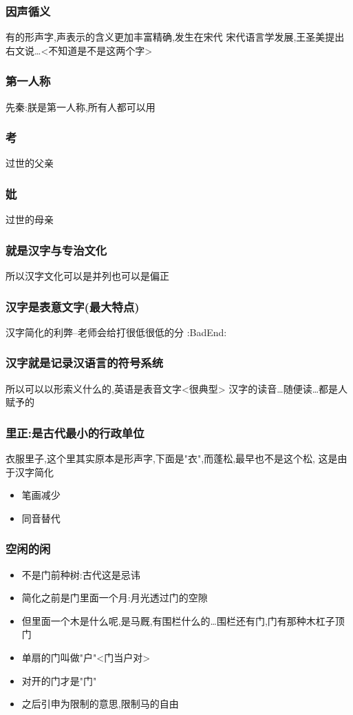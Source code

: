\documentclass[11pt]{article}
\begin{document}
\subsubsection{因声循义}
\label{sec:orga6aa051}
有的形声字,声表示的含义更加丰富精确,发生在宋代
宋代语言学发展,王圣美提出右文说\ldots{}<不知道是不是这两个字>
\subsubsection{第一人称}
\label{sec:org93fc844}
先秦:朕是第一人称,所有人都可以用
\subsubsection{考}
\label{sec:orge879933}
过世的父亲
\subsubsection{妣}
\label{sec:orge92db9c}
过世的母亲
\subsubsection{就是汉字与专治文化}
\label{sec:orge1c0486}
所以汉字文化可以是并列也可以是偏正
\subsubsection{汉字是表意文字(最大特点)}
\label{sec:org4297bd4}
汉字简化的利弊--老师会给打很低很低的分 :BadEnd:
\subsubsection{汉字就是记录汉语言的符号系统}
\label{sec:org5a0b286}
所以可以以形索义什么的,英语是表音文字<很典型>
汉字的读音\ldots{}随便读\ldots{}都是人赋予的


\subsubsection{里正:是古代最小的行政单位}
\label{sec:org7f9e086}
衣服里子,这个里其实原本是形声字,下面是"衣",而蓬松,最早也不是这个松,
这是由于汉字简化
\begin{itemize}
\item 笔画减少
\item 同音替代
\end{itemize}
\subsubsection{空闲的闲}
\label{sec:orgf264c8d}
\begin{itemize}
\item 不是门前种树:古代这是忌讳
\item 简化之前是门里面一个月:月光透过门的空隙
\item 但里面一个木是什么呢,是马厩,有围栏什么的\ldots{}围栏还有门,门有那种木杠子顶门
\item 单扇的门叫做"户"<门当户对>
\item 对开的门才是"门"
\item 之后引申为限制的意思,限制马的自由
\end{itemize}
\end{document}
